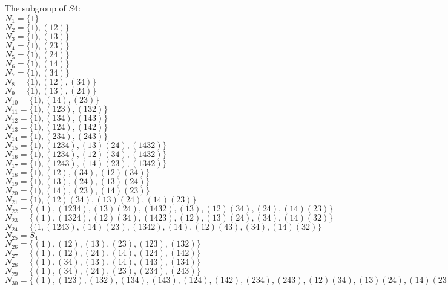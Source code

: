\documentclass[a4paper, justified]{tufte-handout}
\begin{document}
\begin{solution}
The subgroup of $S4$:\\
$N_1=\{1\}$\\
$N_2=\{1),(12)\}$\\
$N_3=\{1),(13)\}$\\
$N_4=\{1),(23)\}$\\
$N_5=\{1),(24)\}$\\
$N_6=\{1),(14)\}$\\
$N_7=\{1),(34)\}$\\
$N_8=\{1),(12),(34)\}$\\
$N_9=\{1),(13),(24)\}$\\
$N_{10}=\{1),(14),(23)\}$\\
$N_{11}=\{1),(123),(132)\}$\\
$N_{12}=\{1),(134),(143)\}$\\
$N_{13}=\{1),(124),(142)\}$\\
$N_{14}=\{1),(234),(243)\}$\\
$N_{15}=\{1),(1234),(13)(24),(1432)\}$\\
$N_{16}=\{1),(1234),(12)(34),(1432)\}$\\
$N_{17}=\{1),(1243),(14)(23),(1342)\}$\\
$N_{18}=\{1),(12),(34),(12)(34)\}$\\
$N_{19}=\{1),(13),(24),(13)(24)\}$\\
$N_{20}=\{1),(14),(23),(14)(23)\}$\\
$N_{21}=\{1),(12)(34),(13)(24),(14)(23)\}$\\
$N_{22}=\{(1),(1234),(13)(24),(1432),(13),(12)(34),(24),(14)(23)\}$\\
$N_{23}=\{(1),(1324),(12)(34),(1423),(12),(13)(24),(34),(14)(32)\}$\\
$N_{24}=\{(1,(1243),(14)(23),(1342),(14),(12)(43),(34),(14)(32)\}$\\
$N_{25}=S_4$\\
$N_{26}=\{(1),(12),(13),(23),(123),(132)\}$\\
$N_{27}=\{(1),(12),(24),(14),(124),(142)\}$\\
$N_{28}=\{(1),(34),(13),(14),(143),(134)\}$\\
$N_{29}=\{(1),(34),(24),(23),(234),(243)\}$\\
$N_{30}=\{(1),(123),(132),(134),(143),(124),(142),(234),(243),(12)(34),(13)(24),(14)(23)\} $
\end{solution}

\begin{problem}[TJ 5-16]
\end{problem}
\end{document}
